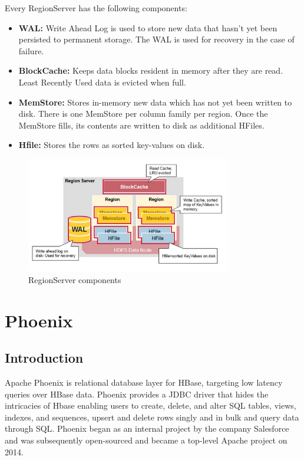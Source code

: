 Every RegionServer has the following components:
\begin{itemize}
\item \textbf{WAL:} Write Ahead Log is used to store new data that hasn't yet been persisted to permanent storage. The WAL is used for recovery in the case of failure.
\item \textbf{BlockCache:} Keeps data blocks resident in memory after they are read. Least Recently Used data is evicted when full.
\item \textbf{MemStore:} Stores in-memory new data which has not yet been written to disk. There is one MemStore per column family per region. Once the MemStore fills, its contents are written to disk as additional HFiles.
\item \textbf{Hfile:} Stores the rows as sorted key-values on disk.
\end{itemize}

\begin{figure}[H]
\centering
\includegraphics[width=0.8\textwidth]{figures/hbase_regionserver_components}
\caption{RegionServer components}
\label{figure:hbase_regionserver_components}
\end{figure}


\section{Phoenix}

\subsection{Introduction}

Apache Phoenix is relational database layer for HBase, targeting low latency queries over HBase data. Phoenix provides a JDBC driver that hides the intricacies of Hbase enabling users to create, delete, and alter SQL tables, views, indexes, and sequences, upsert and delete rows singly and in bulk and query data through SQL. Phoenix began as an internal project by the company Salesforce and was subsequently open-sourced and became a top-level Apache project on 2014.

